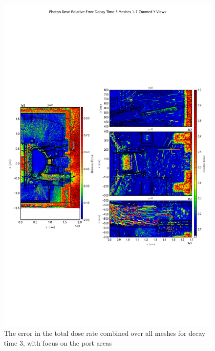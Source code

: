 \documentclass[12pt]{article}
\begin{document}
\begin{figure}[ht!]
\centering
\includegraphics[trim={0cm 9cm 0cm 10cm},clip,scale=0.75]{../plots/final_model_with_b4c/Photon_Dose_Relative_Error_Decay_Time_3_Meshes_1-7_Zoomed_Y_Views.png}
\caption{The error in the total dose rate combined over all meshes for decay time 3, with focus on the port areas}
\label{fig:photons_dc3_b4c_total_error_zoomed}
\end{figure}

\newpage
\clearpage
\end{document}
